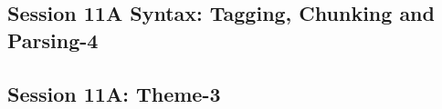 \subsection{\large Session 11A Syntax: Tagging, Chunking and Parsing-4}
\label{parallel-session-11A-trackH}
\TrackHLoc\hfill\sessionchair{}{}
\clearpage
\subsection{\large Session 11A: Theme-3}
\label{parallel-session-11A-trackI}
\TrackILoc\hfill\sessionchair{}{}
\clearpage


